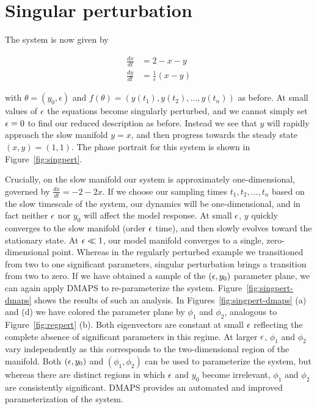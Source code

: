 \section{Singular perturbation}

The system is now given by

\begin{align}
  \frac{dx}{dt}&=2-x-y\\
  \frac{dy}{dt}&= \frac{1}{\epsilon}(x-y)
\end{align}    

with $\theta = (y_0, \epsilon)$ and
$f(\theta) = \left(y(t_1), y(t_2), \dots, y(t_n) \right)$ as
before. At small values of $\epsilon$ the equations become singularly
perturbed, and we cannot simply set $\epsilon = 0$ to find our reduced
description as before. Instead we see that $y$ will rapidly approach
the slow manifold $y = x$, and then progress towards the steady state
$(x,y) = (1,1)$. The phase portrait for this system is shown in
Figure~\ref{fig:singpert}.

Crucially, on the slow manifold our system is approximately
one-dimensional, governed by $\frac{dx}{dt} = -2 - 2x$. If we choose
our sampling times $t_1, t_2, \dots, t_n$ based on the slow timescale
of the system, our dynamics will be one-dimensional, and in fact
neither $\epsilon$ nor $y_0$ will affect the model response. At small
$\epsilon$, $y$ quickly converges to the slow manifold (order $\epsilon$
time), and then slowly evolves toward the stationary state. At
$\epsilon \ll 1$, our model manifold converges to a single,
zero-dimensional point. Whereas in the regularly perturbed example we
transitioned from two to one significant parameters, singular
perturbation brings a transition from two to zero. If we have obtained
a sample of the $(\epsilon, y_0)$ parameter plane, we can again apply
DMAPS to re-parameterize the system. Figure~\ref{fig:singpert-dmaps}
shows the results of such an analysis. In
Figures~\ref{fig:singpert-dmaps} (a) and (d) we have colored the
parameter plane by $\phi_1$ and $\phi_2$, analogous to
Figure~\ref{fig:regpert} (b). Both eigenvectors are constant at small
$\epsilon$ reflecting the complete absence of significant parameters in
this regime. At larger $\epsilon$, $\phi_1$ and $\phi_2$ vary
independently as this corresponds to the two-dimensional region of the
manifold. Both $(\epsilon, y_0)$ and $(\phi_1, \phi_2)$ can be used to
parameterize the system, but whereas there are distinct regions in
which $\epsilon$ and $y_0$ become irrelevant, $\phi_1$ and $\phi_2$ are
consistently significant. DMAPS provides an automated and improved
parameterization of the system.

